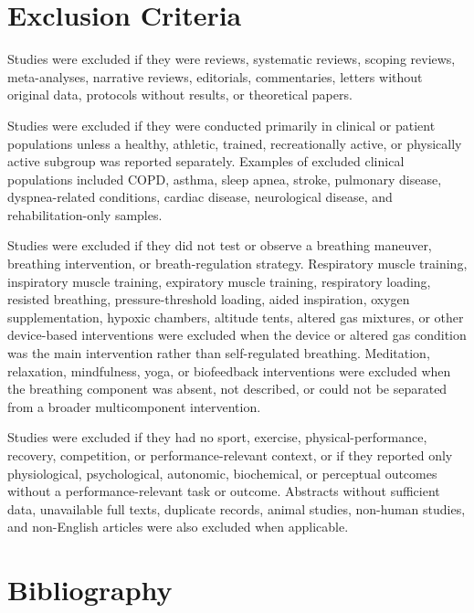 \documentclass[12pt,a4paper]{article}
\begin{document}
\section{Exclusion Criteria}
Studies were excluded if they were reviews, systematic reviews, scoping reviews, meta-analyses, narrative reviews, editorials, commentaries, letters without original data, protocols without results, or theoretical papers.

Studies were excluded if they were conducted primarily in clinical or patient populations unless a healthy, athletic, trained, recreationally active, or physically active subgroup was reported separately. Examples of excluded clinical populations included COPD, asthma, sleep apnea, stroke, pulmonary disease, dyspnea-related conditions, cardiac disease, neurological disease, and rehabilitation-only samples.

Studies were excluded if they did not test or observe a breathing maneuver, breathing intervention, or breath-regulation strategy. Respiratory muscle training, inspiratory muscle training, expiratory muscle training, respiratory loading, resisted breathing, pressure-threshold loading, aided inspiration, oxygen supplementation, hypoxic chambers, altitude tents, altered gas mixtures, or other device-based interventions were excluded when the device or altered gas condition was the main intervention rather than self-regulated breathing. Meditation, relaxation, mindfulness, yoga, or biofeedback interventions were excluded when the breathing component was absent, not described, or could not be separated from a broader multicomponent intervention.

Studies were excluded if they had no sport, exercise, physical-performance, recovery, competition, or performance-relevant context, or if they reported only physiological, psychological, autonomic, biochemical, or perceptual outcomes without a performance-relevant task or outcome. Abstracts without sufficient data, unavailable full texts, duplicate records, animal studies, non-human studies, and non-English articles were also excluded when applicable.

\section{Bibliography}
\nocite{*}
\printbibliography[heading=none]
\end{document}
